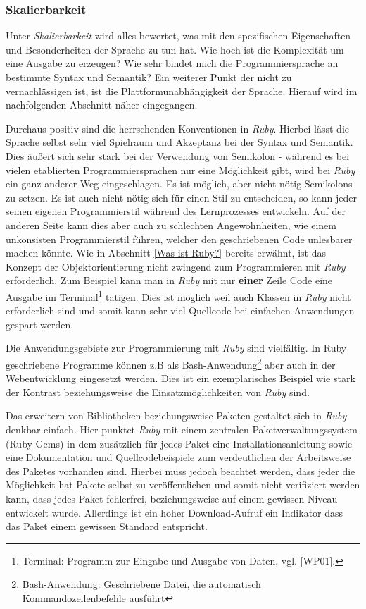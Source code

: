 \documentclass[12pt,DIV=14, version=first, BCOR=10mm,a4paper,twoside,parskip=half-,headsepline,headinclude]{scrartcl}
\begin{document}
\subsubsection{Skalierbarkeit} \label{Skalierbarkeit}
\begin{flushleft}
Unter \textit{Skalierbarkeit} wird alles bewertet, was mit den spezifischen Eigenschaften und Besonderheiten der Sprache zu tun hat. Wie hoch ist die Komplexität um eine Ausgabe zu erzeugen? Wie sehr bindet mich die Programmiersprache an bestimmte Syntax und Semantik? Ein weiterer Punkt der nicht zu vernachlässigen ist, ist die Plattformunabhängigkeit der Sprache. Hierauf wird im nachfolgenden Abschnitt näher eingegangen.

Durchaus positiv sind die herrschenden Konventionen in \textit{\glqq Ruby\grqq}. Hierbei lässt die Sprache selbst sehr viel Spielraum und Akzeptanz bei der Syntax und Semantik. Dies äußert sich sehr stark bei der Verwendung von Semikolon - während es bei vielen etablierten Programmiersprachen nur eine Möglichkeit gibt, wird bei \textit{\glqq Ruby\grqq} ein ganz anderer Weg eingeschlagen. Es ist möglich, aber nicht nötig Semikolons zu setzen. Es ist auch nicht nötig sich für einen Stil zu entscheiden, so kann jeder seinen eigenen Programmierstil während des Lernprozesses entwickeln. Auf der anderen Seite kann dies aber auch zu schlechten Angewohnheiten, wie einem unkonsisten Programmierstil führen, welcher den geschriebenen Code unlesbarer machen könnte. Wie in Abschnitt \ref{Was ist Ruby?} bereits erwähnt, ist das Konzept der Objektorientierung nicht zwingend zum Programmieren mit \textit{\glqq Ruby\grqq} erforderlich. Zum Beispiel kann man in \textit{\glqq Ruby\grqq} mit nur \textbf{einer} Zeile Code eine Ausgabe im Terminal\footnote{\label{foot:3} {Terminal: Programm zur Eingabe und Ausgabe von Daten, vgl. [WP01].}} tätigen. Dies ist möglich weil auch Klassen in \textit{\glqq Ruby\grqq} nicht erforderlich sind und somit kann sehr viel Quellcode bei einfachen Anwendungen gespart werden.

Die Anwendungsgebiete zur Programmierung mit \textit{\glqq Ruby\grqq} sind vielfältig. In Ruby geschriebene Programme können z.B als Bash-Anwendung\footnote{\label{foot:4} {Bash-Anwendung: Geschriebene Datei, die automatisch Kommandozeilenbefehle ausführt}} aber auch in der Webentwicklung eingesetzt werden. Dies ist ein exemplarisches Beispiel wie stark der Kontrast beziehungsweise die Einsatzmöglichkeiten von \textit{\glqq Ruby\grqq} sind.

Das erweitern von Bibliotheken beziehungsweise Paketen gestaltet sich in \textit{\glqq Ruby\grqq} denkbar einfach. Hier punktet \textit{\glqq Ruby\grqq} mit einem zentralen Paketverwaltungssystem (Ruby Gems) in dem zusätzlich für jedes Paket eine Installationsanleitung sowie eine Dokumentation und Quellcodebeispiele zum verdeutlichen der Arbeitsweise des Paketes vorhanden sind. Hierbei muss jedoch beachtet werden, dass jeder die Möglichkeit hat Pakete selbst zu veröffentlichen und somit nicht verifiziert werden kann, dass jedes Paket fehlerfrei, beziehungsweise auf einem gewissen Niveau entwickelt wurde. Allerdings ist ein hoher Download-Aufruf ein Indikator dass das Paket einem gewissen Standard entspricht.


\end{flushleft}
\end{document}
